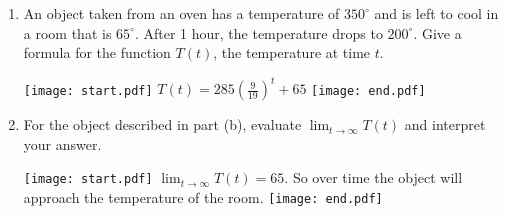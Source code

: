 \documentclass[12pt]{article}
\begin{document}
\begin{enumerate}
\begin{enumerate}
\item An object taken from an oven has a temperature of $350^{\circ}$ and is left to cool in a room that is $65^{\circ}$.  After 1 hour, the temperature drops to $200^{\circ}$.  Give a formula for the function $T(t)$, the temperature at time $t$.

\texttt{[image: start.pdf]}
{{$T(t)=285\left(\frac{9}{19}\right)^t+65$}}
\texttt{[image: end.pdf]}


\item For the object described in part (b), evaluate $\lim_{t \rightarrow \infty}{T(t)}$ and interpret your answer.

\texttt{[image: start.pdf]}
{{$\lim_{t \rightarrow \infty}{T(t)}=65$.  So over time the object will approach the temperature of the room.}}
\texttt{[image: end.pdf]}


\end{enumerate}

\end{enumerate}
\end{document}

